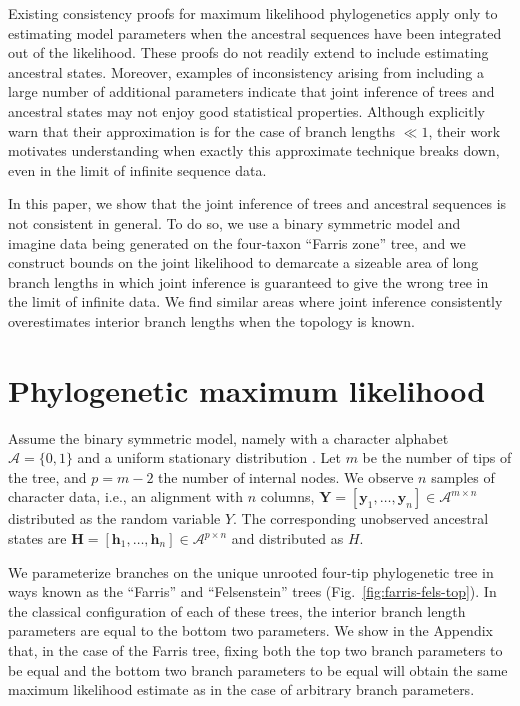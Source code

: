 \documentclass{article}
\newcommand{\alphabet}{\mathcal{A}}
\newcommand{\fullAlignment}{\mathbf{Y}}
\newcommand{\alignmentColumn}{\mathbf{y}}
\newcommand{\alignmentColumnRV}{Y}
\newcommand{\fullAncestralStates}{\mathbf{H}}
\newcommand{\ancestralStateColumn}{\mathbf{h}}
\newcommand{\ancestralStateColumnRV}{H}
\newcommand{\nCols}{n}
\newcommand{\nSiteRows}{m}
\newcommand{\nAncestralStateRows}{p}
\begin{document}
Existing consistency proofs for maximum likelihood phylogenetics \cite{RoyChoudhury2015-ta} apply only to estimating model parameters when the ancestral sequences have been integrated out of the likelihood.
These proofs do not readily extend to include estimating ancestral states.
Moreover, examples of inconsistency arising from including a large number of additional parameters \cite{Neyman1948-tt} indicate that joint inference of trees and ancestral states may not enjoy good statistical properties.
Although \cite{Sagulenko2017-jo} explicitly warn that their approximation is for the case of branch lengths $\ll 1$, their work motivates understanding when exactly this approximate technique breaks down, even in the limit of infinite sequence data.

In this paper, we show that the joint inference of trees and ancestral sequences is not consistent in general.
To do so, we use a binary symmetric model and imagine data being generated on the four-taxon ``Farris zone'' \cite{Siddall1998-hq} tree, and we construct bounds on the joint likelihood to demarcate a sizeable area of long branch lengths in which joint inference is guaranteed to give the wrong tree in the limit of infinite data.
We find similar areas where joint inference consistently overestimates interior branch lengths when the topology is known.

\section*{Phylogenetic maximum likelihood}

Assume the binary symmetric model, namely with a character alphabet $\alphabet=\{0,1\}$ and a uniform stationary distribution \cite{Semple2003-em}.
Let $\nSiteRows$ be the number of tips of the tree, and $\nAncestralStateRows = \nSiteRows-2$ the number of internal nodes.
We observe $\nCols$ samples of character data, i.e., an alignment with $\nCols$ columns, $\fullAlignment=[\alignmentColumn_1,\ldots,\alignmentColumn_\nCols]\in\alphabet^{\nSiteRows\times\nCols}$ distributed as the random variable $\alignmentColumnRV$.
The corresponding unobserved ancestral states are $\fullAncestralStates=[\ancestralStateColumn_1,\ldots,\ancestralStateColumn_\nCols]\in\alphabet^{\nAncestralStateRows\times\nCols}$ and distributed as $\ancestralStateColumnRV$.

We parameterize branches on the unique unrooted four-tip phylogenetic tree in ways known as the ``Farris'' and ``Felsenstein'' trees (Fig.~\ref{fig:farris-fels-top}).
In the classical configuration of each of these trees, the interior branch length parameters are equal to the bottom two parameters.
We show in the Appendix that, in the case of the Farris tree, fixing both the top two branch parameters to be equal and the bottom two branch parameters to be equal will obtain the same maximum likelihood estimate as in the case of arbitrary branch parameters.
\end{document}
